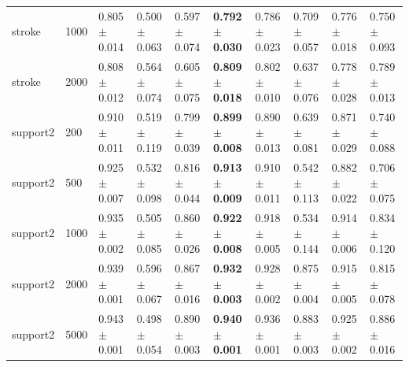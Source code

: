 \begin{table}
\begin{tabular}{llllllllll}
stroke & 1000 & 0.805 $\pm$ 0.014 & 0.500 $\pm$ 0.063 & 0.597 $\pm$ 0.074 & \textbf{0.792 $\pm$ 0.030} & 0.786 $\pm$ 0.023 & 0.709 $\pm$ 0.057 & 0.776 $\pm$ 0.018 & 0.750 $\pm$ 0.093 \\
stroke & 2000 & 0.808 $\pm$ 0.012 & 0.564 $\pm$ 0.074 & 0.605 $\pm$ 0.075 & \textbf{0.809 $\pm$ 0.018} & 0.802 $\pm$ 0.010 & 0.637 $\pm$ 0.076 & 0.778 $\pm$ 0.028 & 0.789 $\pm$ 0.013 \\
support2 & 200 & 0.910 $\pm$ 0.011 & 0.519 $\pm$ 0.119 & 0.799 $\pm$ 0.039 & \textbf{0.899 $\pm$ 0.008} & 0.890 $\pm$ 0.013 & 0.639 $\pm$ 0.081 & 0.871 $\pm$ 0.029 & 0.740 $\pm$ 0.088 \\
support2 & 500 & 0.925 $\pm$ 0.007 & 0.532 $\pm$ 0.098 & 0.816 $\pm$ 0.044 & \textbf{0.913 $\pm$ 0.009} & 0.910 $\pm$ 0.011 & 0.542 $\pm$ 0.113 & 0.882 $\pm$ 0.022 & 0.706 $\pm$ 0.075 \\
support2 & 1000 & 0.935 $\pm$ 0.002 & 0.505 $\pm$ 0.085 & 0.860 $\pm$ 0.026 & \textbf{0.922 $\pm$ 0.008} & 0.918 $\pm$ 0.005 & 0.534 $\pm$ 0.144 & 0.914 $\pm$ 0.006 & 0.834 $\pm$ 0.120 \\
support2 & 2000 & 0.939 $\pm$ 0.001 & 0.596 $\pm$ 0.067 & 0.867 $\pm$ 0.016 & \textbf{0.932 $\pm$ 0.003} & 0.928 $\pm$ 0.002 & 0.875 $\pm$ 0.004 & 0.915 $\pm$ 0.005 & 0.815 $\pm$ 0.078 \\
support2 & 5000 & 0.943 $\pm$ 0.001 & 0.498 $\pm$ 0.054 & 0.890 $\pm$ 0.003 & \textbf{0.940 $\pm$ 0.001} & 0.936 $\pm$ 0.001 & 0.883 $\pm$ 0.003 & 0.925 $\pm$ 0.002 & 0.886 $\pm$ 0.016 \\
\bottomrule
\end{tabular}
\end{table}
